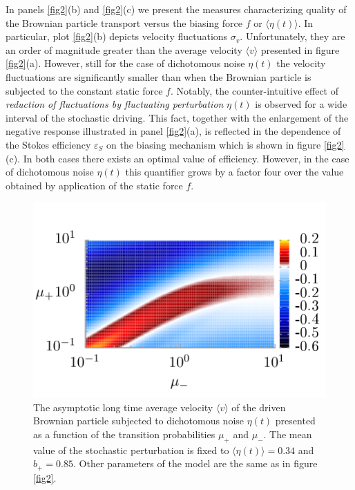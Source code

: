\documentclass[12pt]{iopart}
\begin{document}
In panels \ref{fig2}(b) and \ref{fig2}(c) we present the measures characterizing quality of the Brownian particle transport versus the biasing force $f$ or $\langle \eta(t)\rangle$. In particular, plot \ref{fig2}(b) depicts velocity fluctuations $\sigma_v$. Unfortunately,  
they are an order of magnitude greater than the average velocity $\langle v \rangle$ presented in figure \ref{fig2}(a). However, still for the case of dichotomous noise $\eta(t)$ 
the velocity fluctuations are significantly smaller than when the Brownian particle is subjected to the constant static force $f$. Notably, the counter-intuitive effect of \emph{reduction of fluctuations by fluctuating perturbation} $\eta(t)$ is observed for a wide interval of the stochastic driving. This fact, together with the enlargement of the negative response  illustrated in panel \ref{fig2}(a), is reflected in 
the dependence of the Stokes efficiency $\varepsilon_S$ on the biasing mechanism which is shown in figure \ref{fig2}(c). In both cases there exists an optimal value of efficiency.   However, in the case of dichotomous noise $\eta(t)$ this quantifier grows by a factor four over the value obtained by application of the static force $f$.
\begin{figure}[t]
	\centering
	\includegraphics[width=0.6\linewidth]{fig4a}
	\caption{The asymptotic long time average velocity $\langle v \rangle$ of the driven Brownian particle subjected to dichotomous noise $\eta(t)$ presented as a function of the transition probabilities $\mu_+$ and $\mu_-$. The mean value of the stochastic perturbation is fixed to $\langle \eta(t) \rangle = 0.34$ and $b_+ = 0.85$. Other parameters of the model are the same as in figure \ref{fig2}.}
	\label{fig4}
\end{figure}
\end{document}
